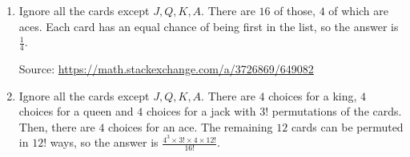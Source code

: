 \begin{enumerate}[label=(\alph*)]
\item  Ignore all the cards except $J,Q,K,A$.  There are $16$ of those, $4$ 
of which are aces.  Each card has an equal chance of being first in the list, 
so the answer is $\frac 14$.

Source: \url{https://math.stackexchange.com/a/3726869/649082}

\item Ignore all the cards except $J,Q,K,A$. There are $4$ choices for a king, 
$4$ choices for a queen and $4$ choices for a jack with $3!$ permutations of the 
cards. Then, there are $4$ choices for an ace. The remaining $12$ cards can be 
permuted in $12!$
ways, so the answer is $\frac{4^{3}\times3!\times4\times12!}{16!}$. 

\end{enumerate}